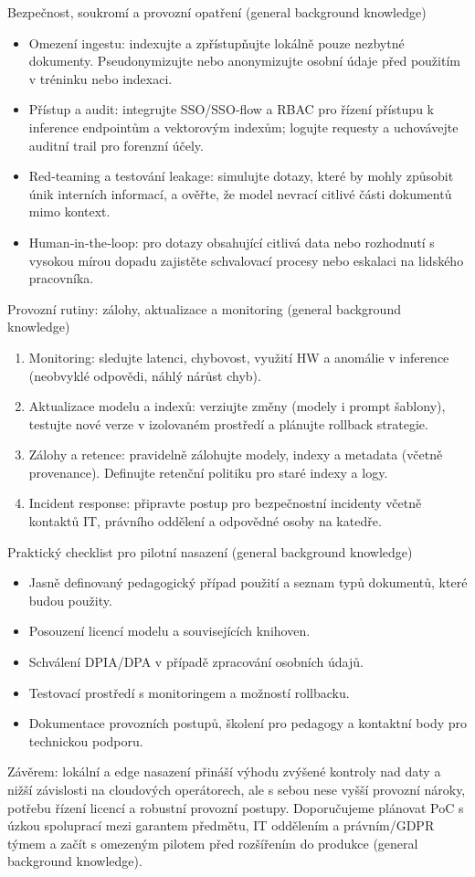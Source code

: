 Bezpečnost, soukromí a provozní opatření (general background knowledge)
\begin{itemize}
  \item Omezení ingestu: indexujte a zpřístupňujte lokálně pouze nezbytné dokumenty. Pseudonymizujte nebo anonymizujte osobní údaje před použitím v tréninku nebo indexaci.
  \item Přístup a audit: integrujte SSO/SSO‑flow a RBAC pro řízení přístupu k inference endpointům a vektorovým indexům; logujte requesty a uchovávejte auditní trail pro forenzní účely.
  \item Red‑teaming a testování leakage: simulujte dotazy, které by mohly způsobit únik interních informací, a ověřte, že model nevrací citlivé části dokumentů mimo kontext.
  \item Human‑in‑the‑loop: pro dotazy obsahující citlivá data nebo rozhodnutí s vysokou mírou dopadu zajistěte schvalovací procesy nebo eskalaci na lidského pracovníka.
\end{itemize}

Provozní rutiny: zálohy, aktualizace a monitoring (general background knowledge)
\begin{enumerate}
  \item Monitoring: sledujte latenci, chybovost, využití HW a anomálie v inference (neobvyklé odpovědi, náhlý nárůst chyb).
  \item Aktualizace modelu a indexů: verziujte změny (modely i prompt šablony), testujte nové verze v izolovaném prostředí a plánujte rollback strategie.
  \item Zálohy a retence: pravidelně zálohujte modely, indexy a metadata (včetně provenance). Definujte retenční politiku pro staré indexy a logy.
  \item Incident response: připravte postup pro bezpečnostní incidenty včetně kontaktů IT, právního oddělení a odpovědné osoby na katedře.
\end{enumerate}

Praktický checklist pro pilotní nasazení (general background knowledge)
\begin{itemize}
  \item Jasně definovaný pedagogický případ použití a seznam typů dokumentů, které budou použity.
  \item Posouzení licencí modelu a souvisejících knihoven.
  \item Schválení DPIA/DPA v případě zpracování osobních údajů.
  \item Testovací prostředí s monitoringem a možností rollbacku.
  \item Dokumentace provozních postupů, školení pro pedagogy a kontaktní body pro technickou podporu.
\end{itemize}

Závěrem: lokální a edge nasazení přináší výhodu zvýšené kontroly nad daty a nižší závislosti na cloudových operátorech, ale s sebou nese vyšší provozní nároky, potřebu řízení licencí a robustní provozní postupy. Doporučujeme plánovat PoC s úzkou spoluprací mezi garantem předmětu, IT oddělením a právním/GDPR týmem a začít s omezeným pilotem před rozšířením do produkce (general background knowledge).
